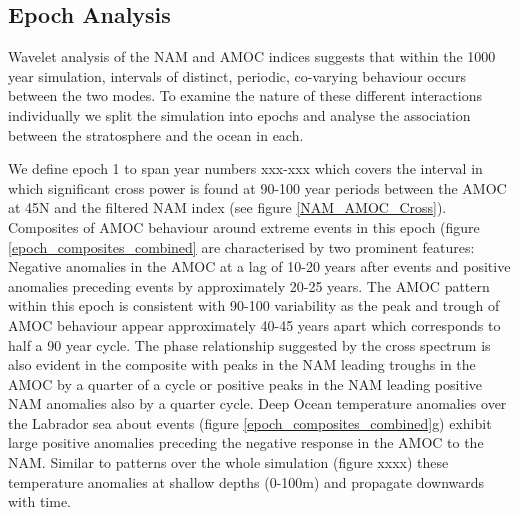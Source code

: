 
\subsection{Epoch Analysis}
Wavelet analysis of the NAM and AMOC indices suggests that within the 1000 year simulation, intervals of distinct, periodic, co-varying behaviour occurs between the two modes. To examine the nature of these different interactions individually we split the simulation into epochs and analyse the association between the stratosphere and the ocean in each. 

We define epoch 1 to span year numbers xxx-xxx which covers the interval in which significant cross power is found at 90-100 year periods between the AMOC at 45N and the filtered NAM index (see figure \ref{NAM_AMOC_Cross}). Composites of AMOC behaviour around extreme events in this epoch (figure \ref{epoch_composites_combined} are characterised by two prominent features: Negative anomalies in the AMOC at a lag of 10-20 years after events and positive anomalies preceding events by approximately 20-25 years. The AMOC pattern within this epoch is consistent with 90-100 variability as the peak and trough of AMOC behaviour appear approximately 40-45 years apart which corresponds to half a 90 year cycle. The phase relationship suggested by the cross spectrum is also evident in the composite with peaks in the NAM leading troughs in the AMOC by a quarter of a cycle or positive peaks in the NAM leading positive NAM anomalies also by a quarter cycle. Deep Ocean temperature anomalies over the Labrador sea about events (figure \ref{epoch_composites_combined}g) exhibit large positive anomalies preceding the negative response in the AMOC to the NAM. Similar to patterns over the whole simulation (figure xxxx) these temperature anomalies at shallow depths (0-100m) and propagate downwards with time.

